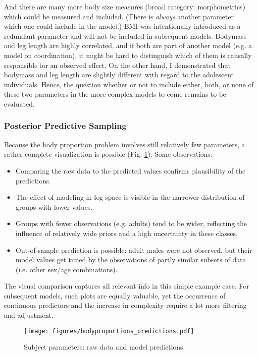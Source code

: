 And there are many more body size measures (broad category: morphometrics) which could be measured and included.
(There is \emph{always} another parameter which one could include in the model.)
BMI was intentionally introduced as a redundant parameter and will not be included in subsequent models.
Bodymass and leg length are highly correlated, and if both are part of another model (e.g. a model on coordination), it might be hard to distinguish which of them is causally responsible for an observed effect.
On the other hand, I demonstrated that bodymass and leg length are slightly different with regard to the adolescent individuals.
Hence, the question whether or not to include either, both, or none of these two parameters in the more complex models to come remains to be evaluated.

\subsubsection{Posterior Predictive Sampling}
\label{sec:org805e0cf}
Because the body proportion problem involves still relatively few parameters, a rather complete visualization is possible (Fig. \ref{fig:bodyproportions}).
Some observations:
\begin{itemize}
\item Comparing the raw data to the predicted values confirms plausibility of the predictions.
\item The effect of modeling in log space is visible in the narrower distribution of groups with lower values.
\item Groups with fewer observations (e.g. adults) tend to be wider, reflecting the influence of relatively wide priors and a high uncertainty in these classes.
\item Out-of-sample prediction is possible: adult males were not observed, but their model values get tuned by the observations of partly similar subsets of data (i.e. other sex/age combinations).
\end{itemize}

The visual comparison captures all relevant info in this simple example case.
For subsequent models, such plots are equally valuable, yet the occurrence of continuous predictors and the increase in complexity require a lot more filtering and adjustment.

\begin{figure}[htbp]
\centering
\texttt{[image: figures/bodyproportions\_predictions.pdf]}
\caption{\label{fig:bodyproportions}Subject parameters: raw data and model predictions.}
\end{figure}


